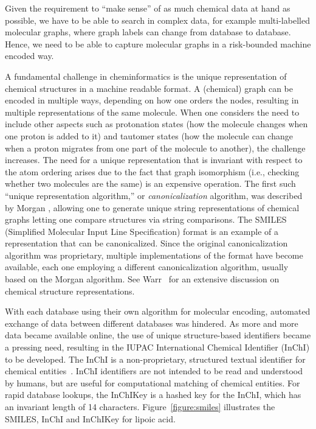 \documentclass{sig-alternate}
\begin{document}
Given the requirement to ``make sense'' of as much chemical data at
hand as possible, we have to be able to search in complex data, for
example multi-labelled molecular graphs, where graph labels can change from database to database. Hence, we need to be able to capture molecular graphs in a
risk-bounded machine encoded way.

A fundamental challenge in cheminformatics is the unique
representation of chemical structures in a machine readable format. A
(chemical) graph can be encoded in multiple ways, depending on how one
orders the nodes, resulting in multiple representations of the same
molecule. When one considers the need to include other aspects such as
protonation states (how the molecule changes when one proton is added to it) and tautomer states (how the molecule can change when a proton migrates from one part of the molecule to another), the challenge increases. The need for
a unique representation that is invariant with respect to the atom
ordering arises due to the fact that graph isomorphism (i.e., checking
whether two molecules are the same) is an expensive operation. The
first such ``unique representation algorithm,'' or \emph{canonicalization} algorithm, was described by Morgan
\cite{Morgan1965}, allowing one to generate unique string
representations of chemical graphs letting one compare structures via
string comparisons. The SMILES (Simplified Molecular Input Line
Specification) format \cite{Weininger:1988kx} is an example of a
representation that can be canonicalized. Since the original
canonicalization algorithm was proprietary, multiple implementations
of the format have become available, each one employing a different
canonicalization algorithm, usually based on the Morgan algorithm. See
Warr~\cite{Warr:2011vn} for an extensive discussion on chemical
structure representations.

With each database using their own algorithm for molecular encoding,
automated exchange of data between different databases was hindered.
As more and more data became available online, the use of unique
structure-based identifiers became a pressing need, resulting in the
IUPAC International Chemical Identifier (InChI) to be developed. The
InChI is a non-proprietary, structured textual identifier for chemical
entities~\cite{inchi}. InChI identifiers are not intended to be read
and understood by humans, but are useful for computational matching of
chemical entities. For rapid database lookups, the InChIKey is a
hashed key for the InChI, which has an invariant length of 14
characters. Figure~\ref{figure:smiles} illustrates
the SMILES, InChI and InChIKey for lipoic acid.
\end{document}
